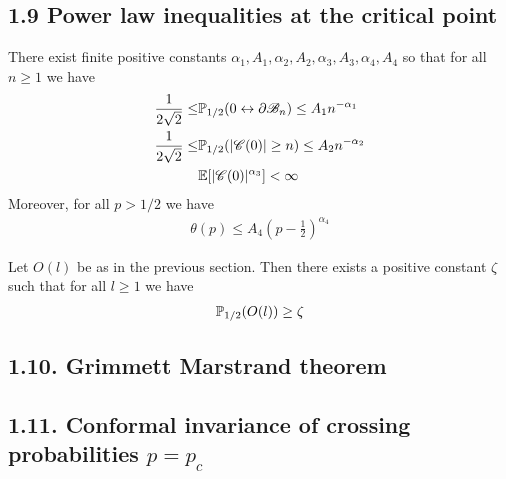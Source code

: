 \documentclass[10pt,a4paper]{report}
\begin{document}
\subsection*{1.9 Power law inequalities at the critical point}

 There exist finite positive constants $\alpha_1,A_1,\alpha_2,A_2,\alpha_3,A_3,\alpha_4,A_4$ so that for all $n\geq 1$ we have
\begin{align*}
\frac{1}{2\sqrt{2}} \leq & \mathbb{P}_{1/2}(0\leftrightarrow \partial \mathscr{B}_n) \leq A_1 n^{-\alpha_1}\\
\frac{1}{2\sqrt{2}} \leq & \mathbb{P}_{1/2}(|\mathscr{C}(0)|\geq n) \leq A_2 n^{-\alpha_2}\\
& \mathbb{E}[|\mathscr{C}(0)|^{\alpha_3} ] <\infty
\end{align*}
Moreover, for all $p>1/2$ we have
\begin{align*}
\theta(p) \leq A_4 (p-\frac{1}{2})^{\alpha_4}
\end{align*}
\s

 Let $O(l)$ be as in the previous section. Then there exists a positive constant $\zeta$ such that for all $l\geq 1$ we have
\begin{align*}
\mathbb{P}_{1/2}(O(l))\geq \zeta
\end{align*}

\subsection*{1.10. Grimmett Marstrand theorem}

\subsection*{1.11. Conformal invariance of crossing probabilities $p=p_c$}
\end{document}
